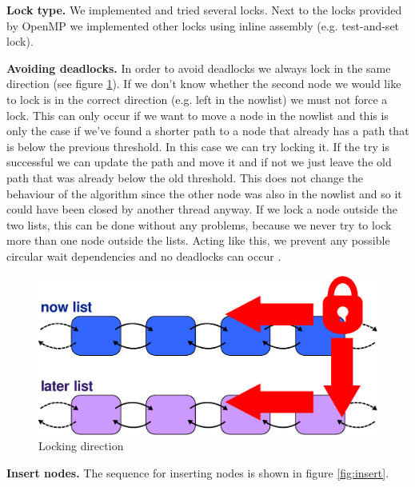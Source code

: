 \documentclass[letterpaper]{article}
\newcommand{\mypar}[1]{{\bf #1.}}
\begin{document}
\mypar{Lock type}
We implemented and tried several locks. Next to the locks provided by OpenMP we implemented other locks using inline assembly (e.g. test-and-set lock). 

\mypar{Avoiding deadlocks}
In order to avoid deadlocks we always lock in the same direction (see figure \ref{fig:lock}). If we don't know whether the second node we would like to lock is in the correct direction (e.g. left in the nowlist) we must not force a lock. This can only occur if we want to move a node in the nowlist and this is only the case if we've found a shorter path to a node that already has a path that is below the previous threshold. In this case we can try locking it. If the try is successful we can update the path and move it and if not we just leave the old path that was already below the old threshold. This does not change the behaviour of the algorithm since the other node was also in the nowlist and so it could have been closed by another thread anyway. 
If we lock a node outside the two lists, this can be done without any problems, because we never try to lock more than one node outside the lists.
Acting like this, we prevent any possible circular wait dependencies and no deadlocks can occur \cite{Coffman:71}.

\begin{figure}[h]\centering
  \includegraphics[scale=0.38]{locking.eps}
  \caption{Locking direction \label{fig:lock}}
\end{figure}

\mypar{Insert nodes}
The sequence for inserting nodes is shown in figure \ref{fig:insert}.
\end{document}
